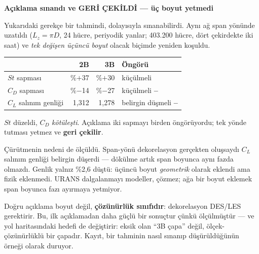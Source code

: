 \documentclass[11pt,a4paper]{article}
\newcommand{\ev}{\textcolor{iyi}{\textbf{\checkmark}}}
\newcommand{\hy}{\textcolor{kotu}{\textbf{--}}}
\newcommand{\kkkenar}{lacivert}
\newcommand{\kkzemin}{kod}
\newenvironment{renkkutu}[3]{%
  \renewcommand{\kkkenar}{#1}\renewcommand{\kkzemin}{#2}%
  \par\medskip\noindent
  \begin{lrbox}{\kutugovde}%
  \begin{minipage}{\dimexpr\linewidth-2\fboxsep-2\fboxrule\relax}\footnotesize
  \textcolor{#1}{\textbf{#3}}\par\vspace{3pt}%
}{%
  \end{minipage}%
  \end{lrbox}%
  \noindent\fcolorbox{\kkkenar}{\kkzemin}{\usebox{\kutugovde}}%
  \par\medskip
}
\newenvironment{reddedilir}[1]{\begin{renkkutu}{kotu}{kotubg}{#1}}{\end{renkkutu}}
\begin{document}
\begin{reddedilir}{Açıklama sınandı ve GERİ ÇEKİLDİ --- üç boyut yetmedi}
Yukarıdaki gerekçe bir tahmindi, dolayısıyla sınanabilirdi. Aynı ağ span
yönünde uzatıldı ($L_z{=}\pi D$, 24 hücre, periyodik yanlar; 403.200 hücre,
dört çekirdekte iki saat) ve \emph{tek değişen üçüncü boyut} olacak biçimde
yeniden koşuldu.

\begin{center}\footnotesize
\begin{tabular}{@{}lrrl@{}}
\toprule
& \textbf{2B} & \textbf{3B} & \textbf{Öngörü} \\
\midrule
$St$ sapması & \%$+$37 & \%$+$30 & küçülmeli \ev \\
$C_D$ sapması & \%$-$14 & \%$-$27 & küçülmeli \hy \\
$C_L$ salınım genliği & 1{,}312 & 1{,}278 & belirgin düşmeli \hy \\
\bottomrule
\end{tabular}
\end{center}

\noindent $St$ düzeldi, $C_D$ \emph{kötüleşti}. Açıklama iki sapmayı birden
öngörüyordu; tek yönde tutması yetmez ve \textbf{geri çekilir}.

Çürütmenin nedeni de ölçüldü. Span-yönü dekorelasyon gerçekten oluşsaydı $C_L$
salınım genliği belirgin düşerdi --- dökülme artık span boyunca aynı fazda
olmazdı. Genlik yalnız \%2{,}6 düştü: üçüncü boyut \emph{geometrik} olarak
eklendi ama fizik eklenmedi. URANS dalgalanmayı modeller, çözmez; ağa bir
boyut eklemek span boyunca fazı ayırmaya yetmiyor.

Doğru açıklama boyut değil, \textbf{çözünürlük sınıfıdır}: dekorelasyon
DES/LES gerektirir. Bu, ilk açıklamadan daha güçlü bir sonuçtur çünkü
ölçülmüştür --- ve yol haritasındaki hedefi de değiştirir: eksik olan ``3B
çapa'' değil, ölçek-çözünürlüklü bir çapadır. Kayıt, bir tahminin nasıl
sınanıp düşürüldüğünün örneği olarak duruyor.
\end{reddedilir}
\end{document}
